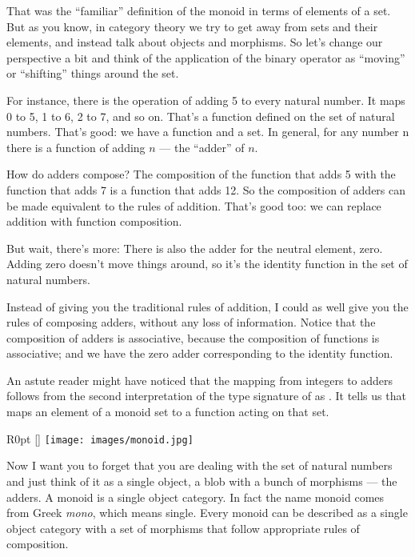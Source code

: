 That was the ``familiar'' definition of the monoid in terms of elements
of a set. But as you know, in category theory we try to get away from
sets and their elements, and instead talk about objects and morphisms.
So let's change our perspective a bit and think of the application of
the binary operator as ``moving'' or ``shifting'' things around the set.

For instance, there is the operation of adding 5 to every natural
number. It maps 0 to 5, 1 to 6, 2 to 7, and so on. That's a function
defined on the set of natural numbers. That's good: we have a function
and a set. In general, for any number n there is a function of adding $n$
--- the ``adder'' of $n$.

How do adders compose? The composition of the function that adds 5 with
the function that adds 7 is a function that adds 12. So the composition
of adders can be made equivalent to the rules of addition. That's good
too: we can replace addition with function composition.

But wait, there's more: There is also the adder for the neutral element,
zero. Adding zero doesn't move things around, so it's the identity
function in the set of natural numbers.

Instead of giving you the traditional rules of addition, I could as well
give you the rules of composing adders, without any loss of information.
Notice that the composition of adders is associative, because the
composition of functions is associative; and we have the zero adder
corresponding to the identity function.

An astute reader might have noticed that the mapping from integers to
adders follows from the second interpretation of the type signature of
 as . It
tells us that  maps an element of a monoid set to a
function acting on that set.

\begin{wrapfigure}[11]{R}{0pt}
\raisebox{0pt}[\dimexpr{}\baselineskip\relax]{
\texttt{[image: images/monoid.jpg]}}
\end{wrapfigure}

Now I want you to forget that you are dealing with the set of natural
numbers and just think of it as a single object, a blob with a bunch of
morphisms --- the adders. A monoid is a single object category. In fact
the name monoid comes from Greek \emph{mono}, which means single. Every
monoid can be described as a single object category with a set of
morphisms that follow appropriate rules of composition.

